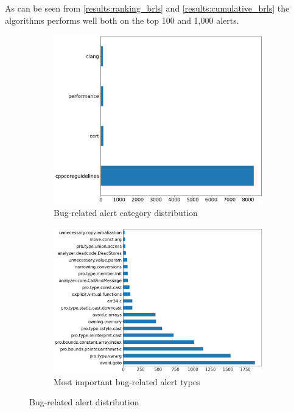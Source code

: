 As can be seen from \cref{results:ranking_brls} and \cref{results:cumulative_brls} the algorithms performs well both on the top 100 and 1,000 alerts.

\begin{figure}[H]
	\begin{subfigure}{0.5\textwidth}
		\centering
		\includegraphics[scale=0.24]{./src/brls/brls_category.png}
		\caption{Bug-related alert category distribution}\label{}
	\end{subfigure}%
	\begin{subfigure}{0.5\textwidth}
		\centering
		\includegraphics[scale=0.25]{./src/brls/brls_type.png}
		\caption{Most important bug-related alert types}\label{}
	\end{subfigure}
	\caption{Bug-related alert distribution}
	\label{results:bralerts}
\end{figure}

